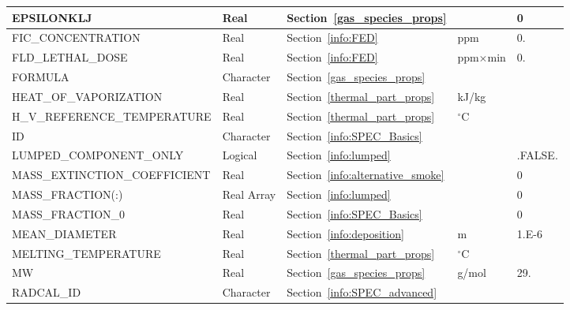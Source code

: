 \documentclass[11pt]{book}
\begin{document}
\begin{longtable}{@{\extracolsep{\fill}}|l|l|l|l|l|}
{\ct EPSILONKLJ}                    & Real        & Section~\ref{gas_species_props}         &                   & 0             \\ \hline
{\ct FIC\_CONCENTRATION}            & Real        & Section~\ref{info:FED}                  & ppm               & 0.            \\ \hline
{\ct FLD\_LETHAL\_DOSE}             & Real        & Section~\ref{info:FED}                  & ppm$\times$min    & 0.            \\ \hline
{\ct FORMULA }                      & Character   & Section~\ref{gas_species_props}         &                   &               \\ \hline
{\ct HEAT\_OF\_VAPORIZATION}        & Real        & Section~\ref{thermal_part_props}        & kJ/kg             &               \\ \hline
{\ct H\_V\_REFERENCE\_TEMPERATURE}  & Real        & Section~\ref{thermal_part_props}        & $^\circ$C         &               \\ \hline
{\ct ID }                           & Character   & Section~\ref{info:SPEC_Basics}          &                   &               \\ \hline
{\ct LUMPED\_COMPONENT\_ONLY}       & Logical     & Section~\ref{info:lumped}               &                   & {\ct .FALSE.} \\ \hline
{\ct MASS\_EXTINCTION\_COEFFICIENT} & Real        & Section~\ref{info:alternative_smoke}    &                   & 0             \\ \hline
{\ct MASS\_FRACTION(:)}             & Real Array  & Section~\ref{info:lumped}               &                   & 0             \\ \hline
{\ct MASS\_FRACTION\_0}             & Real        & Section~\ref{info:SPEC_Basics}          &                   & 0             \\ \hline
{\ct MEAN\_DIAMETER}                & Real        & Section~\ref{info:deposition}           & m                 & 1.E-6         \\ \hline
{\ct MELTING\_TEMPERATURE}          & Real        & Section~\ref{thermal_part_props}        & $^\circ$C         &               \\ \hline
{\ct MW}                            & Real        & Section~\ref{gas_species_props}         & g/mol             & 29.           \\ \hline
{\ct RADCAL\_ID}                    & Character   & Section~\ref{info:SPEC_advanced}        &                   &               \\ \hline

\end{longtable}
\end{document}
